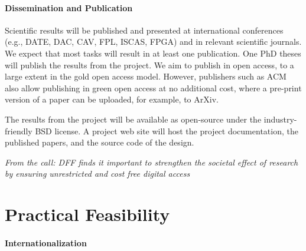 \documentclass[fleqn,12pt]{article}
\begin{document}


\paragraph*{Dissemination and Publication}

Scientific results will be published and presented at international
conferences (e.g., DATE, DAC, CAV, FPL, ISCAS, FPGA) and in relevant scientific journals.
We expect that most tasks will result in at least one publication.
One PhD theses will publish the results from the project.
We aim to publish in open access, to a large extent in the gold open access model.
However, publishers such as ACM also allow publishing in green open access
at no additional cost, where a pre-print version of a paper can be uploaded,
for example, to ArXiv.

The results from the project will be available as open-source under the
industry-friendly BSD license.
A project web site will host the project documentation, the published papers, and the
source code of the design.

\emph{From the call: DFF finds it important to strengthen the societal effect of research by ensuring unrestricted and cost free digital access}



\section{Practical Feasibility}


\paragraph*{Internationalization}
\end{document}
